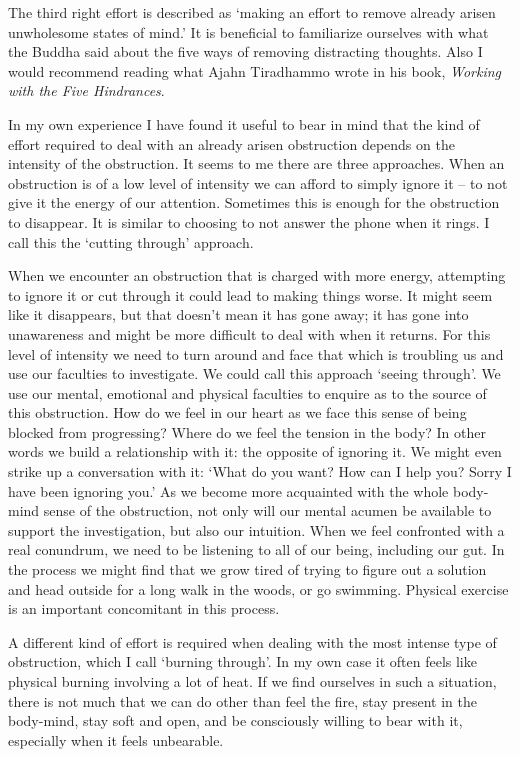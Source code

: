 The third right effort is described as `making an effort to remove
already arisen unwholesome states of mind.' It is beneficial to
familiarize ourselves with what the Buddha said about the five ways of
removing distracting thoughts\cite{thoughts}. Also I
would recommend reading what Ajahn Tiradhammo wrote in his book,
\emph{Working with the Five Hindrances}\cite{hindrances}.

In my own experience I have found it useful to bear in mind that the
kind of effort required to deal with an already arisen obstruction
depends on the intensity of the obstruction. It seems to me there are
three approaches. When an obstruction is of a low level of intensity we
can afford to simply ignore it -- to not give it the energy of our
attention. Sometimes this is enough for the obstruction to disappear. It
is similar to choosing to not answer the phone when it rings. I call
this the `cutting through' approach.

When we encounter an obstruction that is charged with more energy,
attempting to ignore it or cut through it could lead to making things
worse. It might seem like it disappears, but that doesn't mean it has
gone away; it has gone into unawareness and might be more difficult to
deal with when it returns. For this level of intensity we need to turn
around and face that which is troubling us and use our faculties to
investigate. We could call this approach `seeing through'. We use our
mental, emotional and physical faculties to enquire as to the source of
this obstruction. How do we feel in our heart as we face this sense of
being blocked from progressing? Where do we feel the tension in the
body? In other words we build a relationship with it: the opposite of
ignoring it. We might even strike up a conversation with it: `What do
you want? How can I help you? Sorry I have been ignoring you.' As we
become more acquainted with the whole body-mind sense of the
obstruction, not only will our mental acumen be available to support the
investigation, but also our intuition. When we feel confronted with a
real conundrum, we need to be listening to all of our being, including
our gut. In the process we might find that we grow tired of trying to
figure out a solution and head outside for a long walk in the woods, or
go swimming. Physical exercise is an important concomitant in this
process.

A different kind of effort is required when dealing with the most
intense type of obstruction, which I call `burning through'. In my own
case it often feels like physical burning involving a lot of heat. If we
find ourselves in such a situation, there is not much that we can do
other than feel the fire, stay present in the body-mind, stay soft and
open, and be consciously willing to bear with it, especially when it
feels unbearable.

